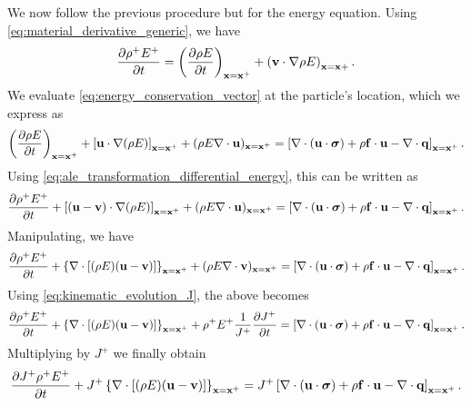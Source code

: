 \documentclass[oneside,a4paper,11pt]{report}
\begin{document}
We now follow the previous procedure but for the energy equation. Using \cref{eq:material_derivative_generic}, we have
\begin{equation}
\label{eq:ale_transformation_differential_energy}
    \frac{\partial \rho^+ E^+}{\partial t} = \left ( \frac{\partial \rho E}{\partial t} \right )_{\mathbf{x} = \mathbf{x}^+} + \left(\mathbf{v} \cdot \nabla \rho E \right)_{\mathbf{x} = \mathbf{x} +}.
\end{equation}
We evaluate \cref{eq:energy_conservation_vector} at the particle's location, which we express as
\begin{equation*}
\left ( \frac{\partial \rho E}{\partial t} \right )_{\mathbf{x} = \mathbf{x}^+} + \left [ \mathbf{u} \cdot \nabla (\rho E) \right]_{\mathbf{x} = \mathbf{x}^+} + (\rho E \nabla \cdot \mathbf{u})_{\mathbf{x} = \mathbf{x}^+} = \left [ \nabla \cdot (\mathbf{u} \cdot \bm \sigma) + \rho \mathbf{f} \cdot \mathbf{u} - \nabla \cdot \mathbf{q} \right ]_{\mathbf{x} = \mathbf{x}^+}.
\end{equation*}
Using \cref{eq:ale_transformation_differential_energy}, this can be written as
\begin{equation*}
\frac{\partial \rho^+ E^+}{\partial t} + \left [ (\mathbf{u} - \mathbf{v}) \cdot \nabla (\rho E) \right]_{\mathbf{x} = \mathbf{x}^+} + (\rho E \nabla \cdot \mathbf{u})_{\mathbf{x} = \mathbf{x}^+} = \left [ \nabla \cdot (\mathbf{u} \cdot \bm \sigma) + \rho \mathbf{f} \cdot \mathbf{u} - \nabla \cdot \mathbf{q} \right ]_{\mathbf{x} = \mathbf{x}^+}.
\end{equation*}
Manipulating, we have
\begin{equation*}
\frac{\partial \rho^+ E^+}{\partial t} + \left \{ \nabla \cdot [ (\rho E) (\mathbf{u} - \mathbf{v}) ] \right \}_{\mathbf{x} = \mathbf{x}^+} + (\rho E \nabla \cdot \mathbf{v})_{\mathbf{x} = \mathbf{x}^+} = \left [ \nabla \cdot (\mathbf{u} \cdot \bm \sigma) + \rho \mathbf{f} \cdot \mathbf{u} - \nabla \cdot \mathbf{q} \right ]_{\mathbf{x} = \mathbf{x}^+}.
\end{equation*}
Using \cref{eq:kinematic_evolution_J}, the above becomes
\begin{equation*}
\frac{\partial \rho^+ E^+}{\partial t} + \left \{ \nabla \cdot [ (\rho E) (\mathbf{u} - \mathbf{v}) ] \right \}_{\mathbf{x} = \mathbf{x}^+} + \rho^+ E^+ \frac{1}{J^+} \frac{\partial J^+}{\partial t} = \left [ \nabla \cdot (\mathbf{u} \cdot \bm \sigma) + \rho \mathbf{f} \cdot \mathbf{u} - \nabla \cdot \mathbf{q} \right ]_{\mathbf{x} = \mathbf{x}^+}.
\end{equation*}
Multiplying by $J^+$ we finally obtain
\begin{equation}
    \label{eq:ale_differential_energy_conservation}
\frac{\partial J^+ \rho^+ E^+}{\partial t} + J^+ \left \{ \nabla \cdot [ (\rho E) (\mathbf{u} - \mathbf{v}) ] \right \}_{\mathbf{x} = \mathbf{x}^+} = J^+ \left [ \nabla \cdot (\mathbf{u} \cdot \bm \sigma) + \rho \mathbf{f} \cdot \mathbf{u} - \nabla \cdot \mathbf{q} \right ]_{\mathbf{x} = \mathbf{x}^+}.
\end{equation}
\end{document}
